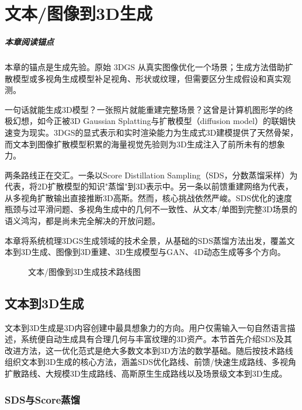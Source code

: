 
\chapter{文本/图像到3D生成}
\label{ch:08}

\paragraph*{本章阅读锚点}
本章的锚点是生成先验。原始 3DGS 从真实图像优化一个场景；生成方法借助扩散模型或多视角生成模型补足视角、形状或纹理，但需要区分生成假设和真实观测。


一句话就能生成3D模型？一张照片就能重建完整场景？这曾是计算机图形学的终极幻想，如今正被3D Gaussian Splatting与扩散模型（diffusion model）的联姻快速变为现实。3DGS的显式表示和实时渲染能力为生成式3D建模提供了天然骨架，而文本到图像扩散模型积累的海量视觉先验则为3D生成注入了前所未有的想象力。

两条路线正在交汇。一条以Score Distillation Sampling（SDS，分数蒸馏采样）为代表，将2D扩散模型的知识"蒸馏"到3D表示中。另一条以前馈重建网络为代表，从多视角扩散输出直接推断3D高斯。然而，核心挑战依然严峻。SDS优化的速度瓶颈与过平滑问题、多视角生成中的几何不一致性、从文本/单图到完整3D场景的语义鸿沟，都是尚未完全解决的开放问题。

本章将系统梳理3DGS生成领域的技术全景，从基础的SDS蒸馏方法出发，覆盖文本到3D生成、图像到3D重建、3D生成模型与GAN、4D动态生成等多个方向。

\begin{figure}[htbp]
\centering
\resizebox{\textwidth}{!}{}
\caption{文本/图像到3D生成技术路线图}
\label{fig:ch08_gen3d_taxonomy}
\end{figure}

\section{文本到3D生成}
\label{sec:08_1}

文本到3D生成是3D内容创建中最具想象力的方向。用户仅需输入一句自然语言描述，系统便自动生成具有合理几何与丰富纹理的3D资产。本节首先介绍SDS及其改进方法，这一优化范式是绝大多数文本到3D方法的数学基础。随后按技术路线组织文本到3D生成的核心方法，涵盖SDS优化路线、前馈/快速生成路线、多视角扩散路线、大规模3D生成路线、高斯原生生成路线以及场景级文本到3D生成。

\subsection{SDS与Score蒸馏}
\label{sec:08_1_1}

